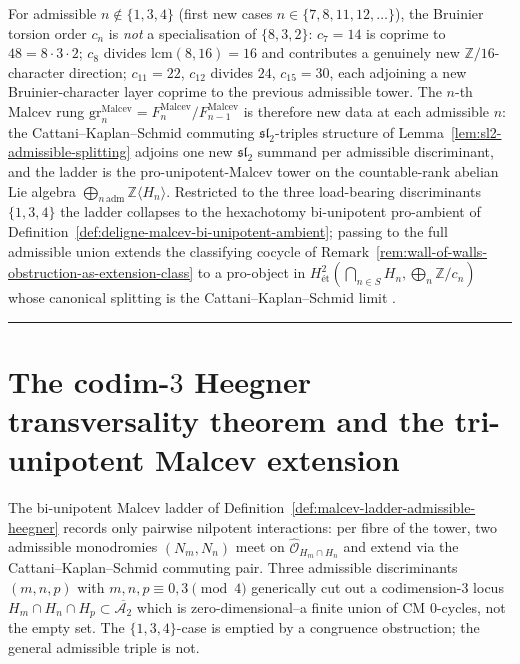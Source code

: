 \begin{remark}
\label{rem:admissible-heegner-new-data-per-n}
%
For admissible $n\notin\{1,3,4\}$ (first new cases
$n\in\{7,8,11,12,\ldots\}$), the Bruinier torsion order $c_n$ is
\emph{not} a specialisation of $\{8,3,2\}$: $c_7=14$ is coprime to
$48=8\cdot 3\cdot 2$; $c_8$ divides $\mathrm{lcm}(8,16)=16$ and
contributes a genuinely new $\mathbb Z/16$-character direction;
$c_{11}=22$, $c_{12}$ divides $24$, $c_{15}=30$, each adjoining a new
Bruinier-character layer coprime to the previous admissible tower.
The $n$-th Malcev rung
$\mathrm{gr}_n^{\mathrm{Malcev}}=F_n^{\mathrm{Malcev}}/F_{n-1}^{\mathrm{Malcev}}$
is therefore new data at each admissible $n$: the
Cattani--Kaplan--Schmid commuting $\mathfrak{sl}_2$-triples structure
of Lemma~\textup{\ref{lem:sl2-admissible-splitting}} adjoins one new
$\mathfrak{sl}_2$ summand per admissible discriminant, and the ladder
is the pro-unipotent-Malcev tower on the countable-rank abelian Lie
algebra $\bigoplus_{n\,\mathrm{adm}}\mathbb Z\langle H_n\rangle$.
Restricted to the three load-bearing discriminants $\{1,3,4\}$ the
ladder collapses to the hexachotomy bi-unipotent pro-ambient of
Definition~\textup{\ref{def:deligne-malcev-bi-unipotent-ambient}};
passing to the full admissible union extends the classifying cocycle
of
Remark~\textup{\ref{rem:wall-of-walls-obstruction-as-extension-class}}
to a pro-object in
$H^2_{\text{\'et}}(\bigcap_{n\in S}H_n,\bigoplus_n\mathbb Z/c_n)$
whose canonical splitting is the Cattani--Kaplan--Schmid limit
\cite[\S 3.7]{CattaniKaplanSchmid1986}.
\end{remark}

\begin{center}
\rule{0.3\textwidth}{0.4pt}
\end{center}

\section{The codim-$3$ Heegner transversality theorem and the
 tri-unipotent Malcev extension}
\label{sec:mc5-codim3-heegner-transversality}

The bi-unipotent Malcev ladder of
Definition~\textup{\ref{def:malcev-ladder-admissible-heegner}} records
only pairwise nilpotent interactions: per fibre of the tower, two
admissible monodromies $(N_m,N_n)$ meet on
$\widehat{\mathcal O}_{H_m\cap H_n}$ and extend via the
Cattani--Kaplan--Schmid commuting pair. Three admissible discriminants
$(m,n,p)$ with $m,n,p\equiv 0,3\pmod 4$ generically cut out a
codimension-$3$ locus
$H_m\cap H_n\cap H_p\subset\overline{\mathcal A_2}$ which is
zero-dimensional--a finite union of CM $0$-cycles, not the empty
set. The $\{1,3,4\}$-case is emptied by a congruence obstruction; the
general admissible triple is not.

